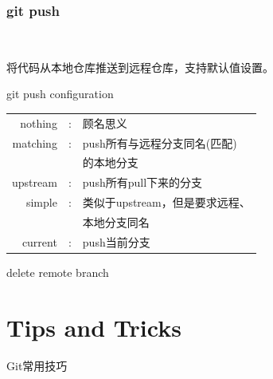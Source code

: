 ﻿\documentclass{beamer}
\begin{document}
\section[git push]{git push}
\begin{frame}{\ {}}
\centerline{将代码从本地仓库推送到远程仓库，支持默认值设置。}
\end{frame}

\begin{frame}{git push configuration}
\begin{center}
{\small\ttfamily
  \begin{tabular}{rcl}
    nothing & : & 顾名思义\\
    matching& : & push所有与远程分支同名(匹配)\\
            &   & 的本地分支\\
    upstream& : & push所有pull下来的分支\\
    simple  & : & 类似于upstream，但是要求远程、\\
            &   & 本地分支同名\\
    current & : & push当前分支\\
  \end{tabular}
}
\end{center}
\end{frame}

\begin{frame}{delete remote branch}
\end{frame}


\part[Tips and Tricks]{Tips and Tricks}
\begin{frame}
\begin{center}
  \ttfamily\huge
  Git常用技巧
\end{center}
\end{frame}
\end{document}
